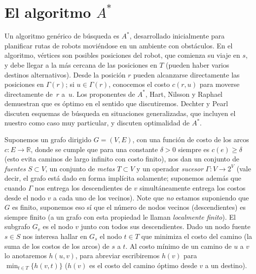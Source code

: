 \section{El algoritmo \(A^*\)}
\label{seq:A-star}

  Un algoritmo genérico de búsqueda es \(A^*\),
  desarrollado inicialmente para planificar rutas de robots
  moviéndose en un ambiente con obstáculos.
  En el algoritmo,
  vértices son posibles posiciones del robot,
  que comienza su viaje en \(s\),
  y debe llegar a la más cercana de las posiciones en \(T\)
  (pueden haber varios destinos alternativos).
  Desde la posición \(r\)
  pueden alcanzarse directamente las posiciones en \(\Gamma(r)\);
  si \(u \in \Gamma(r)\),
  conocemos el costo \(c(r, u)\) para moverse directamente de~\(r\) a~\(u\).
  Los proponentes de \(A^*\),
  Hart, Nilsson y Raphael~%
    \cite{hart68:_A-star}
  demuestran que es óptimo en el sentido que discutiremos.
  Dechter y Pearl~%
    \cite{dechter85:_gen_best_first_search}
  discuten esquemas de búsqueda en situaciones generalizadas,
  que incluyen el nuestro como caso muy particular,
  y discuten optimalidad de \(A^*\).

  Suponemos un grafo dirigido \(G = (V, E)\),
  con una función de costo de los arcos \(c \colon E \to \mathbb{R}\),
  donde se cumple que para una constante \(\delta > 0\)
  siempre es \(c(e) \ge \delta\)
  (esto evita caminos de largo infinito con costo finito),
  nos dan un conjunto de \emph{fuentes} \(S \subset V\),
  un conjunto de \emph{metas} \(T \subset V\)
  y un operador \emph{sucesor} \(\Gamma \colon V \to 2^V\)
  (vale decir,
   el grafo está dado en forma implícita solamente;
   suponemos además que cuando \(\Gamma\)
   nos entrega los descendientes de \(v\)
   simultáneamente entrega los costos
   desde el nodo \(v\) a cada uno de los vecinos).
  Note que \emph{no} estamos suponiendo que \(G\) es finito,
  suponemos eso sí que el número de nodos vecinos (descendientes)
  es siempre finito
  (a un grafo con esta propiedad le llaman \emph{localmente finito}).
  El subgrafo \(G_v\) es el nodo \(v\) junto con todos sus descendientes.
  Dado un nodo fuente \(s \in S\)
  nos interesa hallar en \(G_s\) el nodo \(t \in T\)
  que minimiza el costo del camino
  (la suma de los costos de los arcos)
  de \(s\) a \(t\).
  Al costo mínimo de un camino de \(u\) a \(v\) lo anotaremos \(h(u, v)\),
  para abreviar escribiremos \(h(v)\) para \(\min_{t \in T} \{ h(v, t) \}\)
  (\(h(v)\) es el costo del camino óptimo desde \(v\) a un destino).

